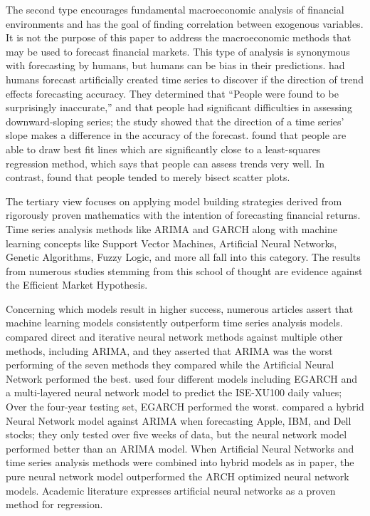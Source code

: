 The second type encourages fundamental macroeconomic analysis of financial environments and has the goal of finding correlation between exogenous variables.
It is not the purpose of this paper to address the macroeconomic methods that may be used to forecast financial markets.
This type of analysis is synonymous with forecasting by humans, but humans can be bias in their predictions.
\citet{OConnor:1997} had humans forecast artificially created time series to discover if the direction of trend effects forecasting accuracy.
They determined that ``People were found to be surprisingly inaccurate,'' and that people had significant difficulties in assessing downward-sloping series; the study showed that the direction of a time series' slope makes a difference in the accuracy of the forecast.
\citet{Hoaglin:2006} found that people are able to draw best fit lines which are significantly close to a least-squares regression method, which says that people can assess trends very well.
In contrast, \citet{Collyer:1990} found that people tended to merely bisect scatter plots.

The tertiary view focuses on applying model building strategies derived from rigorously proven mathematics with the intention of forecasting financial returns.
Time series analysis methods like ARIMA and GARCH along with machine learning concepts like Support Vector Machines, Artificial Neural Networks, Genetic Algorithms, Fuzzy Logic, and more all fall into this category.
The results from numerous studies stemming from this school of thought are evidence against the Efficient Market Hypothesis.

Concerning which models result in higher success, numerous articles assert that machine learning models consistently outperform time series analysis models.
\citet{Hamzacebi:2009} compared direct and iterative neural network methods against multiple other methods, including ARIMA, and they asserted that ARIMA was the worst performing of the seven methods they compared while the Artificial Neural Network performed the best.
\citet{Yumlu:2005} used four different models including EGARCH and a multi-layered neural network model to predict the ISE-XU100 daily values; Over the four-year testing set, EGARCH performed the worst.
\citet{Hassan:2007} compared a hybrid Neural Network model against ARIMA when forecasting Apple, IBM, and Dell stocks; they only tested over five weeks of data, but the neural network model performed better than an ARIMA model.
When Artificial Neural Networks and time series analysis methods were combined into hybrid models as in \citet{Hyup:2007} paper, the pure neural network model outperformed the ARCH optimized neural network models.
Academic literature expresses artificial neural networks as a proven method for regression.

